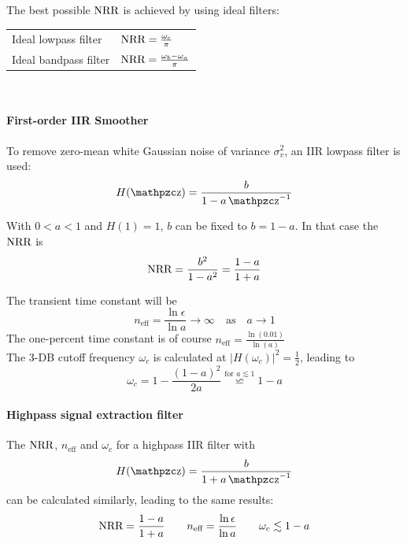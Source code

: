 The best possible $\operatorname{\text{NRR}}$ is achieved by using ideal filters:

\begin{tabularx}{\linewidth}{lX}
	Ideal lowpass filter & $\operatorname{\text{NRR}} = \frac{\omega_c}{\pi}$ \\
	Ideal bandpass filter & $\operatorname{\text{NRR}} = \frac{\omega_b - \omega_a}{\pi}$ \\
\end{tabularx} \\

\paragraph{First-order IIR Smoother}
To remove zero-mean white Gaussian noise of variance $\sigma_v^2$, an 
IIR lowpass filter is used:
\begin{equation*}
	H(\z) = \frac{b}{1-a\z^{-1}}
\end{equation*}

With $0 < a < 1$ and $H(1)=1$, $b$ can be fixed to $b=1-a$. In that 
case the $\operatorname{\text{NRR}}$ is
\begin{equation*}
	\operatorname{\text{NRR}} = \frac{b^2}{1-a^2} = \frac{1-a}{1+a}
\end{equation*}

The transient time constant will be
\begin{equation*}
	n_{\text{eff}} = \frac{\ln \epsilon}{\ln a} \to \infty \quad \text{as} \quad a \to 1
\end{equation*}
The one-percent time constant is of course
 $n_{\text{eff}}=\frac{\ln(0.01)}{\ln(a)}$ \\

The 3-DB cutoff frequency $\omega_c$ is calculated at 
$\left| H(\omega_c) \right|^2 = \frac{1}{2}$, leading to
\begin{equation*}
	\omega_c = 1 - \frac{(1-a)^2}{2 a} \stackrel{\text{for } a \lesssim 1}{\backsimeq} 1-a
\end{equation*}

\paragraph{Highpass signal extraction filter}
The $\operatorname{\text{NRR}}$, $n_{\text{eff}}$ and $\omega_c$ for a highpass IIR filter with
\begin{equation*}
	H(\z) = \frac{b}{1+a\z^{-1}}
\end{equation*}
can be calculated similarly, leading to the same results:
\begin{equation*}
	\operatorname{\text{NRR}} = \frac{1-a}{1+a} \qquad n_{\text{eff}} = \frac{\ln \epsilon}{\ln a} \qquad \omega_c \lesssim 1-a
\end{equation*}

